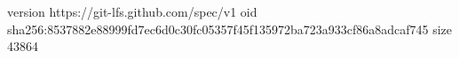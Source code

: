 version https://git-lfs.github.com/spec/v1
oid sha256:8537882e88999fd7ec6d0c30fc05357f45f135972ba723a933cf86a8adcaf745
size 43864
